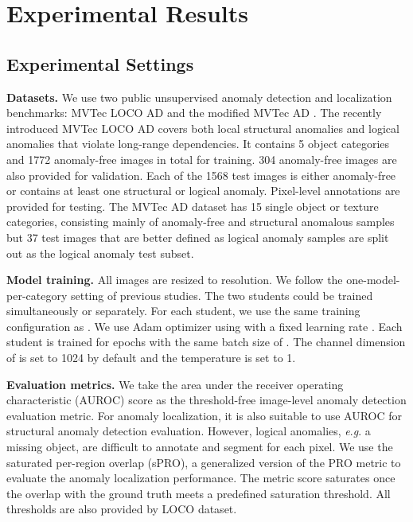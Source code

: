 \documentclass[10pt,twocolumn,letterpaper]{article}
\begin{document}
\section{Experimental Results}
\subsection{Experimental Settings}
\textbf{Datasets.} We use two public unsupervised anomaly detection and localization benchmarks: MVTec LOCO AD \cite{bergmann2022beyond} and the modified MVTec AD \cite{bergmann2019mvtec}. The recently introduced MVTec LOCO AD covers both local structural anomalies and logical anomalies that violate long-range dependencies. It contains 5 object categories and 1772 anomaly-free images in total for training. 304 anomaly-free images are also provided for validation. Each of the 1568 test images is either anomaly-free or contains at least one structural or logical anomaly. Pixel-level annotations are provided for testing. The MVTec AD dataset has 15 single object or texture categories, consisting mainly of anomaly-free and structural anomalous samples but 37 test images that are better defined as logical anomaly samples \cite{bergmann2022beyond} are split out as the logical anomaly test subset. \par


\textbf{Model training.} All images are resized to  resolution. We follow the one-model-per-category setting of previous studies. The two students could be trained simultaneously or separately. For each student, we use the same training configuration as \cite{deng2022anomaly}. We use Adam optimizer using  with a fixed learning rate . Each student is trained for  epochs with the same batch size of . The channel dimension  of  is set to 1024 by default and the temperature  is set to 1.\par

\textbf{Evaluation metrics.} We take the area under the receiver operating characteristic (AUROC) score as the threshold-free image-level anomaly detection evaluation metric. For anomaly localization, it is also suitable to use AUROC for structural anomaly detection evaluation. However, logical anomalies, {\textit{e}.\textit{g}.} a missing object, are difficult to annotate and segment for each pixel. We use the saturated per-region overlap (sPRO)\cite{bergmann2022beyond}, a generalized version of the PRO metric \cite{bergmann2019mvtec} to evaluate the anomaly localization performance. The metric score saturates once the overlap with the ground truth meets a predefined saturation threshold. All thresholds are also provided by LOCO dataset.
\end{document}
